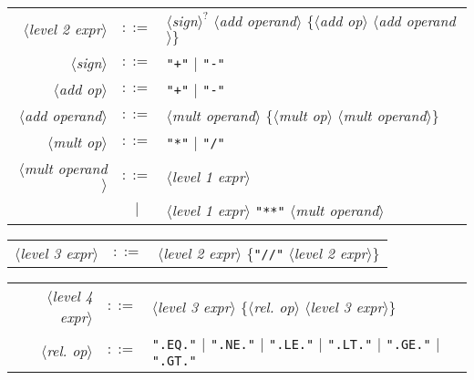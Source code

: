 \begin{tabular}{rcl}
  $\langle$\textit{level 2 expr}$\rangle$ & $::=$ &
  $\langle$\textit{sign}$\rangle^{?}$ $\langle$\textit{add operand}$\rangle$ 
  $\{\langle$\textit{add op}$\rangle$ $\langle$\textit{add operand}$\rangle\}$\\
  $\langle$\textit{sign}$\rangle$ & $::=$ & \texttt{"+"} $\mid$ \texttt{"-"}\\
  $\langle$\textit{add op}$\rangle$ & $::=$ & \texttt{"+"} $\mid$ \texttt{"-"}\\
  $\langle$\textit{add operand}$\rangle$ & $::=$ & $\langle$\textit{mult operand}$\rangle$  $\{\langle$\textit{mult op}$\rangle$ $\langle$\textit{mult operand}$\rangle\}$\\
  $\langle$\textit{mult op}$\rangle$ & $::=$ & \texttt{"*"} $\mid$ \texttt{"/"}\\
  $\langle$\textit{mult operand}$\rangle$ & $::=$ & $\langle$\textit{level 1 expr}$\rangle$ \\
  & $\mid$ & $\langle$\textit{level 1 expr}$\rangle$ \texttt{"**"} $\langle$\textit{mult operand}$\rangle$\\
\end{tabular}

\begin{tabular}{rcl}
  $\langle$\textit{level 3 expr}$\rangle$ & $::=$ & $\langle$\textit{level 2 expr}$\rangle$ $\{$\texttt{"//"} $\langle$\textit{level 2 expr}$\rangle\}$\\
\end{tabular}

\begin{tabular}{rcl}
  $\langle$\textit{level 4 expr}$\rangle$ & $::=$ & $\langle$\textit{level 3 expr}$\rangle$ $\{\langle$\textit{rel. op}$\rangle$ $\langle$\textit{level 3 expr}$\rangle\}$\\
  $\langle$\textit{rel. op}$\rangle$ & $::=$ & \texttt{".EQ."} $\mid$
  \texttt{".NE."} $\mid$
  \texttt{".LE."} $\mid$
   \texttt{".LT."} $\mid$
  \texttt{".GE."} $\mid$
   \texttt{".GT."}\\
\end{tabular}

